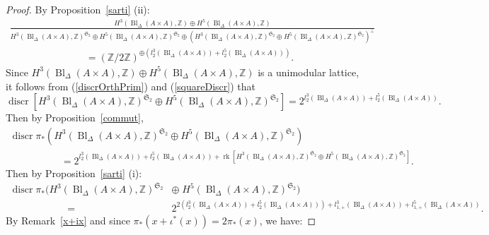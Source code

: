 \documentclass{alggeom}
\DeclareMathOperator{\rk}{rk}
\DeclareMathOperator{\discr}{discr}
\DeclareMathOperator{\Bl}{Bl}
\newcommand{\Z}{\mathbb{Z}}
\theoremstyle{plain}
\theoremstyle{definition}
\theoremstyle{remark}
\begin{document}
\begin{proof}
By Proposition~\ref{sarti} (ii):
\footnotesize
\begin{gather*}
\frac{H^{3}(\Bl_\Delta(A\! \times\! A),\Z)\oplus H^{5}(\Bl_\Delta(A\! \times\! A),\Z)}{H^{3}(\Bl_\Delta(A\! \times\! A),\Z)^{\mathfrak{S}_2}\oplus H^{5}(\Bl_\Delta(A\! \times\! A),\Z)^{\mathfrak{S}_2}\oplus \left(H^{3}(\Bl_\Delta(A\! \times\! A),\Z)^{\mathfrak{S}_2}\oplus H^{5}(\Bl_\Delta(A\! \times\! A),\Z)^{\mathfrak{S}_2}\right)^\bot}\hspace{30pt}
\\\hspace{92pt}= \left(\Z/2\Z\right)^{\oplus\left(l_2^3(\Bl_\Delta(A\! \times\! A))+l_2^5(\Bl_\Delta(A\! \times\! A))\right)}.
\end{gather*}
\normalsize
Since $H^{3}(\Bl_\Delta(A\! \times\! A),\Z)\oplus H^{5}(\Bl_\Delta(A\! \times\! A),\Z)$ is a unimodular lattice, 
it follows from (\ref{discrOrthPrim}) and (\ref{squareDiscr}) that 
$$\discr \left[H^{3}(\Bl_\Delta(A\! \times\! A),\Z)^{\mathfrak{S}_2}\oplus H^{5}(\Bl_\Delta(A\! \times\! A),\Z)^{\mathfrak{S}_2}\right]=2^{l_2^3(\Bl_\Delta(A\! \times\! A))+l_2^5(\Bl_\Delta(A\! \times\! A))}.$$
Then by Proposition~\ref{commut},
\begin{gather*}
\discr \pi_{*}(H^{3}(\Bl_\Delta(A\! \times\! A),\Z)^{\mathfrak{S}_2}\oplus H^{5}(\Bl_\Delta(A\! \times\! A),\Z)^{\mathfrak{S}_2})\hspace{55pt}\\
\hspace{62pt}=2^{l_2^3(\Bl_\Delta(A\! \times\! A))+l_2^5(\Bl_\Delta(A\! \times\! A))+\rk \left[H^{3}(\Bl_\Delta(A\! \times\! A),\Z)^{\mathfrak{S}_2}\oplus H^{5}(\Bl_\Delta(A\! \times\! A),\Z)^{\mathfrak{S}_2}\right]}.
\end{gather*}
Then by Proposition~\ref{sarti} (i):
\begin{equation}\label{odddiscr}
\begin{array}{rl}
\discr \pi_{*}(H^{3}(\Bl_\Delta(A\! \times\! A),\Z)^{\mathfrak{S}_2}\!\!\!\!&\oplus\; H^{5}(\Bl_\Delta(A\! \times\! A),\Z)^{\mathfrak{S}_2})\hspace{55pt}\\
\hspace{70pt} =\!\! & 2^{2\left( l_2^3(\Bl_\Delta(A\! \times\! A))+ l_2^5(\Bl_\Delta(A\! \times\! A))\right)+l_{1,+}^3(\Bl_\Delta(A\! \times\! A))+l_{1,+}^5(\Bl_\Delta(A\! \times\! A))}.
\end{array}
\end{equation}
By Remark~\ref{x+ix} and since $\pi_*(x+\iota^*(x))=2\pi_*(x)$, we have:

\end{proof}
\end{document}
